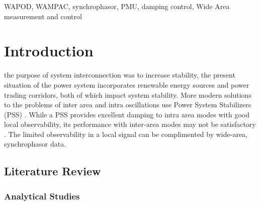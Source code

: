 \documentclass[journal]{IEEEtran}
\begin{document}
\begin{abstract}

\end{abstract}

\begin{IEEEkeywords}
WAPOD, WAMPAC, synchrophasor, PMU, damping control, Wide Area measurement and control
\end{IEEEkeywords}






%
\IEEEpeerreviewmaketitle



\section{Introduction}
 the purpose of system interconnection was to increase stability, the present situation of the power system incorporates renewable energy sources and power trading corridors, both of which impact system stability. More modern solutions to the problems of inter area and intra oscillations use Power System Stabilizers (PSS) \cite{Dmello}. While a PSS provides excellent damping to intra area modes with good local observability, its performance with inter-area modes may not be satisfactory \cite{localREMcomparison}. The limited observability in a local signal can be complimented by wide-area, synchrophasor data. 

\subsection{Literature Review}

\subsubsection*{Analytical Studies}
\end{document}

